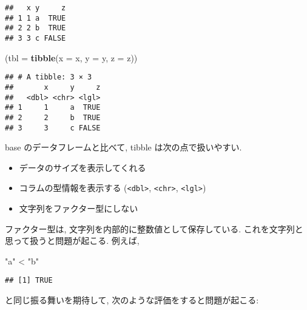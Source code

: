 \documentclass[a4paper]{scrbook}
\newenvironment{Shaded}{\begin{snugshade}}{\end{snugshade}}
\newcommand{\KeywordTok}[1]{\textcolor[rgb]{0.13,0.29,0.53}{\textbf{{#1}}}}
\newcommand{\DataTypeTok}[1]{\textcolor[rgb]{0.13,0.29,0.53}{{#1}}}
\newcommand{\DecValTok}[1]{\textcolor[rgb]{0.00,0.00,0.81}{{#1}}}
\newcommand{\StringTok}[1]{\textcolor[rgb]{0.31,0.60,0.02}{{#1}}}
\newcommand{\NormalTok}[1]{{#1}}
\providecommand{\tightlist}{%
  \setlength{\itemsep}{0pt}\setlength{\parskip}{0pt}}
\theoremstyle{definition}
\begin{document}
\begin{verbatim}
##   x y     z
## 1 1 a  TRUE
## 2 2 b  TRUE
## 3 3 c FALSE
\end{verbatim}

\begin{Shaded}
\begin{Highlighting}[]
\NormalTok{(}\DataTypeTok{tbl =} \KeywordTok{tibble}\NormalTok{(}\DataTypeTok{x =} \NormalTok{x, }\DataTypeTok{y =} \NormalTok{y, }\DataTypeTok{z =} \NormalTok{z))}
\end{Highlighting}
\end{Shaded}

\begin{verbatim}
## # A tibble: 3 × 3
##       x     y     z
##   <dbl> <chr> <lgl>
## 1     1     a  TRUE
## 2     2     b  TRUE
## 3     3     c FALSE
\end{verbatim}

base のデータフレームと比べて, tibble は次の点で扱いやすい.

\begin{itemize}
\tightlist
\item
  データのサイズを表示してくれる
\item
  コラムの型情報を表示する (\texttt{\textless{}dbl\textgreater{}},
  \texttt{\textless{}chr\textgreater{}},
  \texttt{\textless{}lgl\textgreater{}})
\item
  文字列をファクター型にしない
\end{itemize}

ファクター型は, 文字列を内部的に整数値として保存している.
これを文字列と思って扱うと問題が起こる. 例えば,

\begin{Shaded}
\begin{Highlighting}[]
\StringTok{"a"} \NormalTok{<}\StringTok{ "b"}
\end{Highlighting}
\end{Shaded}

\begin{verbatim}
## [1] TRUE
\end{verbatim}

と同じ振る舞いを期待して, 次のような評価をすると問題が起こる:

\begin{Shaded}
\end{Shaded}
\end{document}
